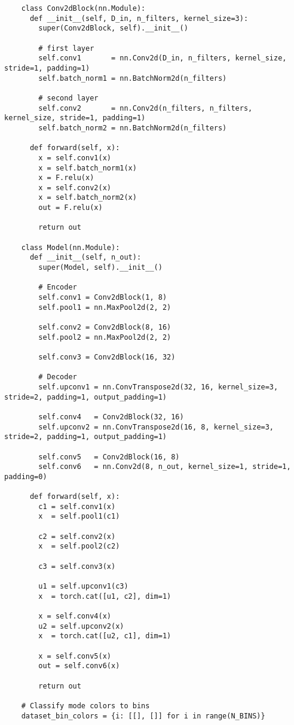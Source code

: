\begin{longlisting}
\begin{verbatim}
    class Conv2dBlock(nn.Module):
      def __init__(self, D_in, n_filters, kernel_size=3):
        super(Conv2dBlock, self).__init__()

        # first layer
        self.conv1       = nn.Conv2d(D_in, n_filters, kernel_size, stride=1, padding=1)
        self.batch_norm1 = nn.BatchNorm2d(n_filters)

        # second layer
        self.conv2       = nn.Conv2d(n_filters, n_filters, kernel_size, stride=1, padding=1)
        self.batch_norm2 = nn.BatchNorm2d(n_filters)
      
      def forward(self, x):
        x = self.conv1(x)
        x = self.batch_norm1(x)
        x = F.relu(x)
        x = self.conv2(x)
        x = self.batch_norm2(x)
        out = F.relu(x)
      
        return out

    class Model(nn.Module):
      def __init__(self, n_out):
        super(Model, self).__init__()
        
        # Encoder
        self.conv1 = Conv2dBlock(1, 8)
        self.pool1 = nn.MaxPool2d(2, 2)

        self.conv2 = Conv2dBlock(8, 16)
        self.pool2 = nn.MaxPool2d(2, 2)

        self.conv3 = Conv2dBlock(16, 32)

        # Decoder
        self.upconv1 = nn.ConvTranspose2d(32, 16, kernel_size=3, stride=2, padding=1, output_padding=1)

        self.conv4   = Conv2dBlock(32, 16)
        self.upconv2 = nn.ConvTranspose2d(16, 8, kernel_size=3, stride=2, padding=1, output_padding=1)

        self.conv5   = Conv2dBlock(16, 8)
        self.conv6   = nn.Conv2d(8, n_out, kernel_size=1, stride=1, padding=0)
        
      def forward(self, x):
        c1 = self.conv1(x)
        x  = self.pool1(c1)

        c2 = self.conv2(x)
        x  = self.pool2(c2)

        c3 = self.conv3(x)

        u1 = self.upconv1(c3)
        x  = torch.cat([u1, c2], dim=1)

        x = self.conv4(x)
        u2 = self.upconv2(x)
        x  = torch.cat([u2, c1], dim=1)

        x = self.conv5(x)
        out = self.conv6(x)

        return out

    # Classify mode colors to bins
    dataset_bin_colors = {i: [[], []] for i in range(N_BINS)}


\end{verbatim}
\end{longlisting}
